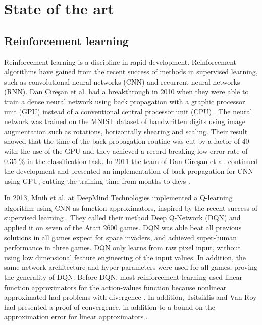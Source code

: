 \documentclass[class=book, crop=false]{standalone}
\begin{document}
\chapter{State of the art}
\section{Reinforcement learning}
Reinforcement learning is a discipline in rapid development. Reinforcement algorithms have gained from the recent success of methods in supervised learning, such as convolutional neural networks (CNN) and  recurrent neural networks (RNN). Dan Cire\c{s}an et al. had a breakthrough in 2010 when they were able to train a dense neural network using back propagation with a graphic processor unit (GPU) instead of a conventional central processor unit (CPU) \cite{DNN_gpu_2010}. The neural network was trained on the MNIST dataset of handwritten digits using image augmentation such as rotations, horizontally shearing and scaling. Their result showed that the time of the back propagation routine was cut by a factor of 40 with the use of the GPU and they achieved a record breaking low error rate of 0.35 \% in the classification task. In 2011 the team of Dan Cire\c{s}an et al. continued the development and presented an implementation of back propagation for CNN using GPU, cutting the training time from months to days \cite{CNN_gpu_2011}.

In 2013, Mnih et al. at DeepMind Technologies implemented a Q-learning algorithm using CNN as function approximators, inspired by the recent success of supervised learning \cite{DQN_Mnih_et_al_2013}. They called their method Deep Q-Network (DQN) and applied it on seven of the Atari 2600 games. DQN was able beat all previous solutions in all games expect for space invaders, and achieved super-human performance in three games. DQN only learns from raw pixel input, without using low dimensional feature engineering of the input values. In addition, the same network architecture and hyper-parameters were used for all games, proving the generality of DQN. Before DQN, most reinforcement learning used linear function approximators for the action-values function because nonlinear approximated had problems with divergence \cite{DQN_Mnih_et_al_2013}. In addition, Tsitsiklis and Van Roy had presented a proof of convergence, in addition to a bound on the approximation error for linear approximators \cite{linear_stable_Tsitsiklis97}.
\end{document}
